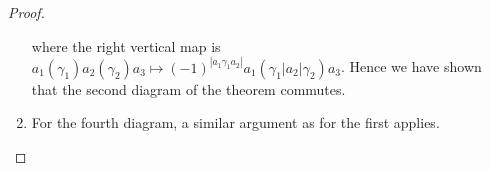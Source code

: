 \documentclass{scrartcl}
\theoremstyle{plain}
\theoremstyle{definition}
\newcommand{\abs}[1]{\left\lvert#1\right\rvert}
\DeclareMathOperator{\id}{id}
\begin{document}
\begin{proof}
\begin{enumerate}
    \begin{center}
    \end{center}
    where the right vertical map is $a_1(\gamma_1)a_2(\gamma_2)a_3 \mapsto (-1)^{\abs{a_1\gamma_1a_2}} a_1(\gamma_1|a_2|\gamma_2)a_3$. Hence we have shown that the second diagram of the theorem commutes.

    \item For the fourth diagram, a similar argument as for the first applies.
    \end{enumerate}
\end{proof}
\end{document}
